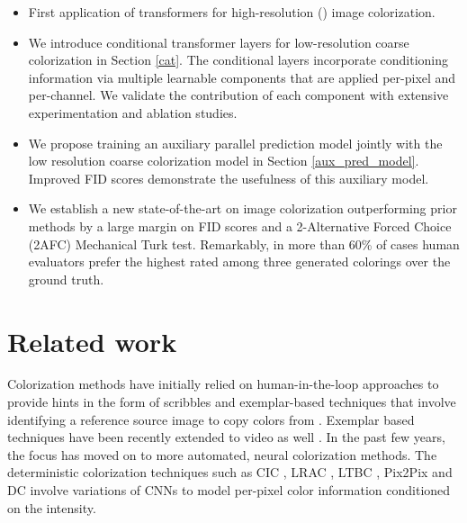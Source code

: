 \documentclass{article} \usepackage{iclr2021_conference,times}
\begin{document}
\begin{itemize}
    \item First application of transformers for high-resolution () image colorization.
    \item We introduce conditional transformer layers for low-resolution coarse colorization in Section \ref{cat}. The conditional layers incorporate conditioning information via multiple learnable components that are applied per-pixel and per-channel. We validate the contribution of each component with extensive experimentation and ablation studies.
    \item We propose training an auxiliary parallel prediction model jointly with the low resolution coarse colorization model in Section \ref{aux_pred_model}. Improved FID scores demonstrate the usefulness of this auxiliary model.
    \item We establish a new state-of-the-art on image colorization outperforming prior methods by a large margin on FID scores and a 2-Alternative Forced Choice (2AFC) Mechanical Turk test. Remarkably, in  more than 60\% of cases human evaluators prefer the highest rated among three generated colorings over the ground truth.
\end{itemize}


\section{Related work}
\label{related_work}
Colorization methods have initially relied on human-in-the-loop approaches to provide hints in the form of scribbles \citep{levin2004colorization, ironi2005colorization, huang2005adaptive, yatziv2006fast, qu2006manga, luan2007natural, tsaftaris2014novel, zhang2017real, ci2018user} and exemplar-based techniques that involve identifying a reference source image to copy colors from \citep{reinhard2001color, welsh2002transferring, tai2005local, ironi2005colorization, pitie2007automated, morimoto2009automatic, gupta2012image, xiao2020example}. Exemplar based techniques have been recently extended to video as well \citep{zhang2019deep}. In the past few years, the focus has  moved on to more automated, neural colorization methods. 
The deterministic colorization techniques such as CIC \citep{zhang2016colorful}, LRAC \citep{larsson2016learning}, LTBC \citep{iizuka2016let}, Pix2Pix \citep{isola2017image} and DC \citep{cheng2015deep, dahl2016automatic} involve variations of CNNs to model per-pixel color information conditioned on the intensity. 
\end{document}
